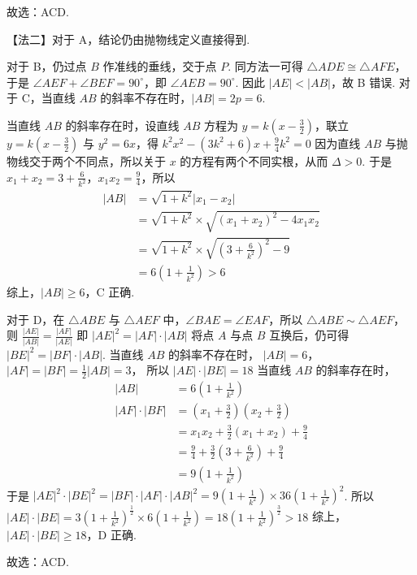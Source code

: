 \documentclass[UTF8,a4paper,oneside,11pt]{ctexbook}
\begin{document}
\begin{solution}
故选：ACD.

【法二】对于 A，结论仍由抛物线定义直接得到.

对于 B，仍过点 \(B\) 作准线的垂线，交于点 \(P\). 同方法一可得 \(\triangle ADE \cong \triangle AFE\)，于是 \(\angle AEF + \angle BEF = 90^\circ\)，即 \(\angle AEB = 90^\circ\). 因此 \(|AE| < |AB|\)，故 B 错误.
对于 C，当直线 \(AB\) 的斜率不存在时，\(|AB| = 2p = 6\).

当直线 \(AB\) 的斜率存在时，设直线 \(AB\) 方程为 \(y = k \left(x - \frac{3}{2}\right)\)，联立 \(y = k \left(x - \frac{3}{2}\right)\) 与 \(y^2 = 6x\)，得
\(k^2 x^2 - (3k^2 + 6)x + \frac{9}{4}k^2 = 0\)
因为直线 \(AB\) 与抛物线交于两个不同点，所以关于 \(x\) 的方程有两个不同实根，从而 \(\Delta > 0\). 于是 \(x_1 + x_2 = 3 + \frac{6}{k^2}\)，\(x_1 x_2 = \frac{9}{4}\)，所以
\begin{align*}
|AB| &= \sqrt{1 + k^2}|x_1 - x_2|\\
&= \sqrt{1 + k^2} \times \sqrt{(x_1 + x_2)^2 - 4x_1 x_2}\\
&= \sqrt{1 + k^2} \times \sqrt{\left(3 + \frac{6}{k^2}\right)^2 - 9}\\
&= 6 \left(1 + \frac{1}{k^2}\right) > 6
\end{align*}
综上，\(|AB| \ge 6\)，C 正确.

对于 D，在 \(\triangle ABE\) 与 \(\triangle AEF\) 中，\(\angle BAE = \angle EAF\)，所以 \(\triangle ABE \sim \triangle AEF\)，则
\(\frac{|AE|}{|AB|} = \frac{|AF|}{|AE|}\)
即
\(
|AE|^2=|AF| \cdot |AB|
\)
将点 \(A\) 与点 \(B\) 互换后，仍可得 \( |BE|^2 = |BF| \cdot |AB| \). 当直线 \(AB\) 的斜率不存在时，
\(|AB|=6\)，\(|AF|=|BF|=\frac{1}{2} |AB|=3\)，
所以
\(
|AE| \cdot |BE|=18
\)
当直线 \(AB\) 的斜率存在时，
\begin{align*}
|AB| &= 6 \left(1 + \frac{1}{k^2}\right)\\
|AF| \cdot |BF|
&= \left(x_1 + \frac{3}{2}\right)\left(x_2 + \frac{3}{2}\right)\\
&= x_1 x_2 + \frac{3}{2}(x_1 + x_2) + \frac{9}{4}\\
&= \frac{9}{4} + \frac{3}{2}\left(3 + \frac{6}{k^2}\right) + \frac{9}{4}\\
&= 9 \left(1 + \frac{1}{k^2}\right)
\end{align*}
于是 \(|AE|^2 \cdot |BE|^2 = |BF| \cdot |AF| \cdot |AB|^2 = 9 \left(1 + \frac{1}{k^2}\right) \times 36 \left(1 + \frac{1}{k^2}\right)^2\).
所以
\(
|AE| \cdot |BE|=3 \left(1 + \frac{1}{k^2}\right)^{\frac{1}{2}} \times 6 \left(1 + \frac{1}{k^2}\right)=18 \left(1 + \frac{1}{k^2}\right)^{\frac{3}{2}}>18
\)
综上，\(|AE| \cdot |BE| \ge 18\)，D 正确.

故选：ACD.
\end{solution}
\end{document}
